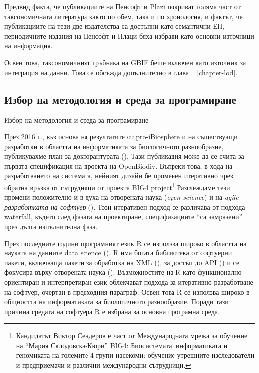 Предвид факта, че публикациите на Пенсофт и Plazi покриват голяма част от таксономичната литература както по обем, така и по хронология, и фактът, че публикациите на тези две издателства са достъпни като семантични ЕП, периодичните издания на Пенсофт и Плаци бяха избрани като основни източници на информация.

Освен това, таксономичният гръбнака на GBIF беше включен \cite{gbif_secretariat_gbif_2017} като източник за интеграция на данни. Това се обсъжда допълнително в глава ~ \ref{chapter-lod}.

\subsection*{Избор на методология и среда за програмиране}
 {Избор на методология и среда за програмиране}

През 2016 г., въз основа на резултатите от pro-iBiosphere и на съществуащи разработки в областта на информатиката за биологичното разнообразие, публикувахме план за докторантурата (\cite{senderov_open_2016}). Тази публикация може да се счита за първата спецификация на проекта на OpenBiodiv. Въпреки това, в хода на разработването на системата, нейният дизайн бе променен итеративно чрез обратна връзка от сътрудници от проекта \href {http://big4-project.eu}{BIG4 project}\footnote {Кандидатът Виктор Сендеров е част от Международната мрежа за обучение на ``Мария Склодовска-Кюри'' BIG4: Биосистемата, информатиката и геномиката на големите 4 групи насекоми: обучение утрешните изследователи и предприемачи и различни международни сътрудници.} Разглеждаме тези промени положително и в духа на отворената наука (\emph {open science}) и на \emph{agile разработката на софтуер} (\cite {beck_manifesto_2001}). Този итеративен подход се различава от подхода waterfall, където след фазата на проектиране, спецификациите ``са замразени'' през дълга изпълнителна фаза.

През последните години програмният език R се използва широко в областта на науката на данните data science (\cite{r_core_team_r:_2016}). R има богата библиотека от софтуерни пакети, включваща пакети за обработка на XML (\cite{wickham_xml2:_2018}), за достъп до API (\cite{wickham_httr:_2017}) и се фокусира върху отворената наука (\cite{boettiger_building_2015}). Възможностите на R като функционално-ориентиран и интерпретиран език облекчават подхода за итеративно разработване на софтуер, очертан в предходния параграф. Освен това R се използва широко в общността на информатиката за биологичното разнообразие. Поради тази причина средата на софтуера R е избрана за основна програмна среда.

